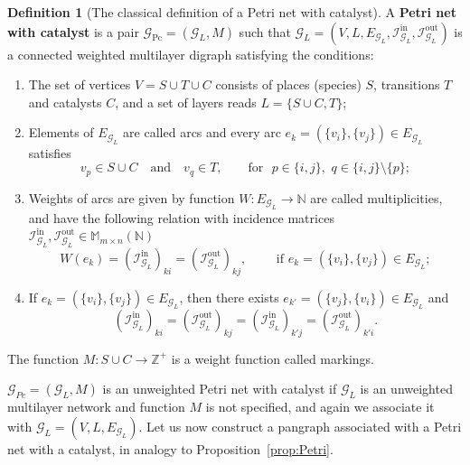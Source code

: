 \documentclass[a4paper,12pt]{article}
\theoremstyle{definition}
\newtheorem{definition}{Definition}
\theoremstyle{remark}
\newcommand{\mG}{\mathcal{G}}
\newcommand{\tin}{\mathrm{in}}
\newcommand{\out}{\mathrm{out}}
\newcommand{\inci}{\mathcal{I}^{\tin}}
\newcommand{\inco}{\mathcal{I}^{\out}}
\begin{document}
\begin{definition}[The classical definition of a Petri net with catalyst]\label{def:Petr&catal}
    A \textbf{ Petri net with catalyst} is a pair $\mathcal{G}_{\textrm{Pc}}=(\mathcal{G}_L,M)$ such that $\mathcal{G}_L=(V,L,E_{\mathcal{G}_L}, \inci_{\mG_L},\inco_{\mG_L})$ is a connected weighted multilayer digraph satisfying the conditions:
    \begin{enumerate}
  \item  The set of vertices $V=S\cup T \cup C$ consists of places (species) $S$, transitions $T$ and catalysts $C$, and a set of layers reads $L=\{S\cup C,T\}$;
    \item  Elements of $E_{\mG_L}$ are called arcs and every arc $e_{k}=(\{v_i\},\{v_j\})\in E_{\mG_L}$ satisfies
    \begin{equation}\label{eq:bipart2}
    v_p\in S\cup C \quad \textrm{and}\quad v_q\in T,\qquad \textrm{for }\,\, p\in \{i,j\},\,\, q\in \{i,j\}\setminus\{p\};
    \end{equation}
    \item  Weights of arcs are given by function $W:E_{\mG_L}\to \mathbb{N}$ are called multiplicities, and have the following relation with incidence matrices  $\inci_{\mG_L},\inco_{\mG_L}\in \mathbb{M}_{m\times n}(\mathbb{N})$
    \begin{equation*}
W(e_k)=\left(\inci_{\mG_L}\right)_{ki}=\left(\inco_{\mG_L}\right)_{kj},\qquad \textrm{ if }e_k=(\{v_i\},\{v_j\})\in E_{\mG_L};
    \end{equation*}
    \item If $e_k=(\{v_i\},\{v_j\})\in E_{\mG_L}$, then there exists $e_{k'}=(\{v_j\},\{v_i\})\in E_{\mG_L}$ and
    \begin{equation}
(\inci_{\mG_L})_{ki}=(\inco_{\mG_L})_{kj}=(\inci_{\mG_L})_{k'j}=(\inco_{\mG_L})_{k'i}.
    \end{equation}
    \end{enumerate}
     The function $M: S \cup C\rightarrow \mathbb{Z}^{+}$ is a weight function called markings.
\end{definition}

$\mG_{Pc}=(\mG_L,M)$ is an \textrm{unweighted Petri net with catalyst} if $\mG_L$ is an unweighted multilayer network and function $M$ is not specified, and again we associate it with $\mG_L=(V,L,E_{\mG_L})$. Let us now construct a pangraph associated with a Petri net with a catalyst, in analogy to Proposition~\ref{prop:Petri}.
\end{document}
